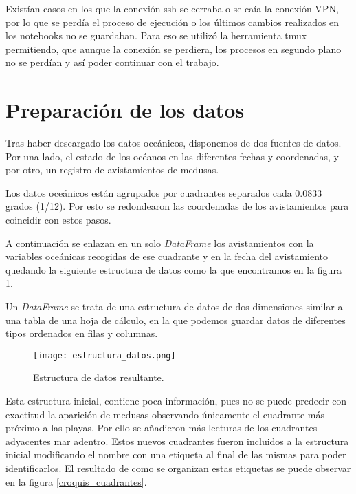 
Existían casos en los que la conexión ssh se cerraba o se caía la conexión VPN, por lo que se perdía el proceso de ejecución o los últimos cambios realizados en los notebooks no se guardaban. Para eso se utilizó la herramienta tmux permitiendo, que aunque la conexión se perdiera, los procesos en segundo plano no se perdían y así poder continuar con el trabajo.

\section{Preparación de los datos}\textsl{}
Tras haber descargado los datos oceánicos, disponemos de dos fuentes de datos. Por una lado, el estado de los océanos en las diferentes fechas y coordenadas, y por otro, un registro de avistamientos de medusas.

Los datos oceánicos están agrupados por cuadrantes separados cada \num{0,0833}  grados (1/12). Por esto se redondearon las coordenadas de los avistamientos para coincidir con estos pasos. 

A continuación se enlazan en un solo \emph{DataFrame} los avistamientos con la variables oceánicas recogidas de ese cuadrante y en la fecha del avistamiento quedando la siguiente estructura de datos como la que encontramos en la figura \ref{dataframe_datos}.

Un \emph{DataFrame} se trata de una estructura de datos de dos dimensiones similar a una tabla de una hoja de cálculo, en la que podemos guardar datos de diferentes tipos ordenados en filas y columnas.

\begin{figure}%
	\centering
	\texttt{[image: estructura\_datos.png]}
	\caption[Estructura de datos resultante.]{Estructura de datos resultante.}\label{dataframe_datos}
\end{figure}


Esta estructura inicial, contiene poca información, pues no se puede predecir con exactitud la aparición de medusas observando únicamente el cuadrante más próximo a las playas. Por ello se añadieron más lecturas de los cuadrantes adyacentes mar adentro. Estos nuevos cuadrantes fueron incluidos a la estructura inicial modificando el nombre con una etiqueta al final de las mismas para poder identificarlos. El resultado de como se organizan estas etiquetas se puede observar en la figura \ref{croquis_cuadrantes}.

